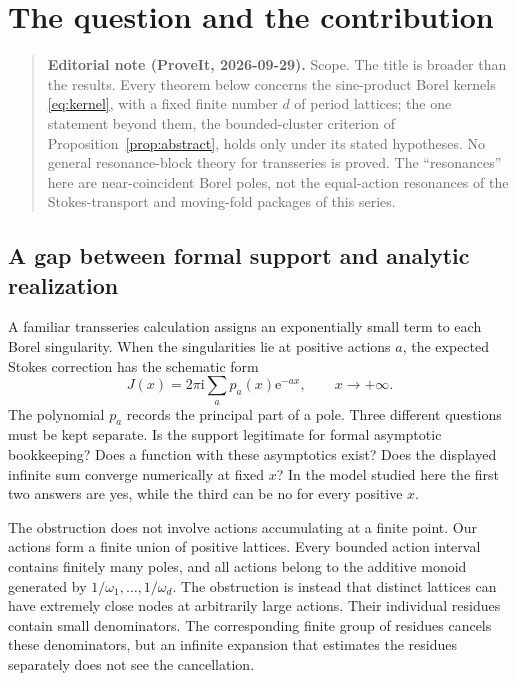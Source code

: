 \documentclass[11pt,a4paper]{article}
\numberwithin{equation}{section}
\theoremstyle{definition}
\theoremstyle{remark}
\newcommand{\ii}{\mathrm i}
\newcommand{\e}{\mathrm e}
\begin{document}
\section{The question and the contribution}
\label{sec:intro}

\begin{quote}\small\textbf{Editorial note (ProveIt, 2026-09-29).} Scope. The title is broader than the results. Every theorem below concerns the sine-product Borel kernels \eqref{eq:kernel}, with a fixed finite number $d$ of period lattices; the one statement beyond them, the bounded-cluster criterion of Proposition~\ref{prop:abstract}, holds only under its stated hypotheses. No general resonance-block theory for transseries is proved. The ``resonances'' here are near-coincident Borel poles, not the equal-action resonances of the Stokes-transport and moving-fold packages of this series.\end{quote}

\subsection{A gap between formal support and analytic realization}
A familiar transseries calculation assigns an exponentially small term to
each Borel singularity. When the singularities lie at positive actions
$a$, the expected Stokes correction has the schematic form
\begin{equation}
 J(x)=2\pi\ii\sum_a p_a(x)\e^{-ax},\qquad x\longrightarrow+\infty.
 \label{eq:schematic}
\end{equation}
The polynomial $p_a$ records the principal part of a pole. Three different
questions must be kept separate. Is the support legitimate for formal
asymptotic bookkeeping? Does a function with these asymptotics exist? Does
the displayed infinite sum converge numerically at fixed $x$? In the model
studied here the first two answers are yes, while the third can be no for
every positive $x$.

The obstruction does not involve actions accumulating at a finite point.
Our actions form a finite union of positive lattices. Every bounded action
interval contains finitely many poles, and all actions belong to the
additive monoid generated by $1/\omega_1,\ldots,1/\omega_d$. The obstruction
is instead that distinct lattices can have extremely close nodes at
arbitrarily large actions. Their individual residues contain small
denominators. The corresponding finite group of residues cancels these
denominators, but an infinite expansion that estimates the residues
separately does not see the cancellation.
\end{document}
